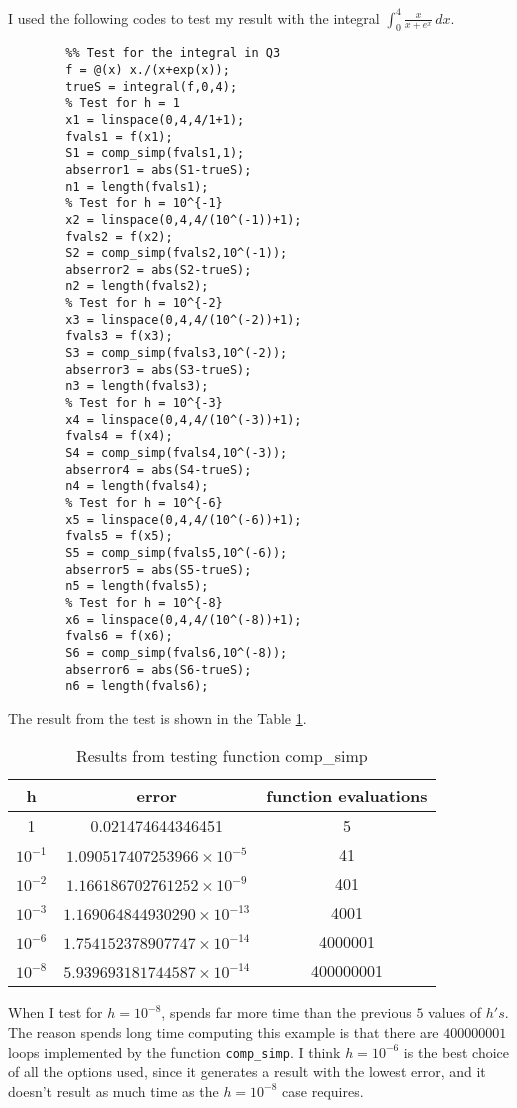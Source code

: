 \begin{answer}
    I used the following codes to test my result with the integral $\int_{0}^{4}{\tfrac{x}{x+e^x}}\,dx$.
    \begin{verbatim}
        %% Test for the integral in Q3
        f = @(x) x./(x+exp(x));
        trueS = integral(f,0,4);
        % Test for h = 1
        x1 = linspace(0,4,4/1+1);
        fvals1 = f(x1);
        S1 = comp_simp(fvals1,1);
        abserror1 = abs(S1-trueS);
        n1 = length(fvals1);
        % Test for h = 10^{-1}
        x2 = linspace(0,4,4/(10^(-1))+1);
        fvals2 = f(x2);
        S2 = comp_simp(fvals2,10^(-1));
        abserror2 = abs(S2-trueS);
        n2 = length(fvals2);
        % Test for h = 10^{-2}
        x3 = linspace(0,4,4/(10^(-2))+1);
        fvals3 = f(x3);
        S3 = comp_simp(fvals3,10^(-2));
        abserror3 = abs(S3-trueS);
        n3 = length(fvals3);
        % Test for h = 10^{-3}
        x4 = linspace(0,4,4/(10^(-3))+1);
        fvals4 = f(x4);
        S4 = comp_simp(fvals4,10^(-3));
        abserror4 = abs(S4-trueS);
        n4 = length(fvals4);
        % Test for h = 10^{-6}
        x5 = linspace(0,4,4/(10^(-6))+1);
        fvals5 = f(x5);
        S5 = comp_simp(fvals5,10^(-6));
        abserror5 = abs(S5-trueS);
        n5 = length(fvals5);
        % Test for h = 10^{-8}
        x6 = linspace(0,4,4/(10^(-8))+1);
        fvals6 = f(x6);
        S6 = comp_simp(fvals6,10^(-8));
        abserror6 = abs(S6-trueS);
        n6 = length(fvals6);
    \end{verbatim}
    The result from the test is shown in the Table \ref{tab:tab1}.
    \begin{table}[H]
    \centering
    \caption{Results from testing function comp\_simp}
    \label{tab:tab1}
    \begin{tabular}{|c|c|c|}
    \hline
    \textbf{h} & \textbf{error}        & \textbf{function evaluations} \\ \hline
    1          & 0.021474644346451     & 5                             \\ \hline
    $10^{-1}$       & $1.090517407253966\times10^{-5}$ & 41                            \\ \hline
    $10^{-2}$       & $1.166186702761252\times10^{-9}$ & 401                           \\ \hline
    $10^{-3}$       & $1.169064844930290\times10^{-13}$ & 4001                          \\ \hline
    $10^{-6}$       & $1.754152378907747\times10^{-14}$ & 4000001                       \\ \hline
    $10^{-8}$       & $5.939693181744587\times10^{-14}$ & 400000001                     \\ \hline
    \end{tabular}
    \end{table}
    When I test for $h = 10^{-8}$, \MATLAB spends far more time than the previous $5$ values of $h's$. The reason \MATLAB spends long time computing this example is that there are $400000001$ loops implemented by the function \verb+comp_simp+. I think $h = 10^{-6}$ is the best choice of all the options used, since it generates a result with the lowest error, and it doesn't result as much time as the $h=10^{-8}$ case requires.
\end{answer}